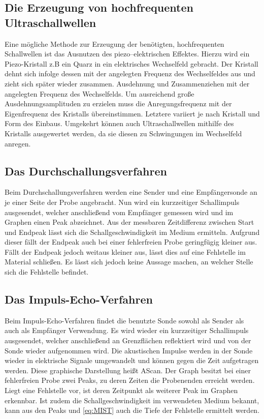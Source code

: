 \subsection{Die Erzeugung von hochfrequenten Ultraschallwellen}
Eine mögliche Methode zur Erzeugung der benötigten, hochfrequenten Schallwellen
ist das Ausnutzen des piezo--elektrischen Effektes. Hierzu wird ein Piezo-Kristall z.B ein Quarz
in ein elektrisches Wechselfeld gebracht. Der Kristall dehnt sich infolge dessen
mit der angelegten Frequenz des Wechselfeldes aus und zieht sich später wieder zusammen.
Ausdehnung und Zusammenziehen mit der angelegten Frequenz des Wechselfelds. Um
ausreichend große Ausdehnungsamplituden zu erzielen muss die Anregungsfrequenz
mit der Eigenfrequenz des Kristalls übereinstimmen. Letztere variiert je nach Kristall
und Form des Einbaus. Umgekehrt können auch Ultraschallwellen mithilfe des Kristalls
ausgewertet werden, da sie diesen zu Schwingungen im Wechselfeld anregen.
\subsection{Das Durchschallungsverfahren}
Beim Durchschallungsverfahren werden eine Sender und eine Empfängersonde an je
einer Seite der Probe angebracht. Nun wird ein kurzzeitiger Schallimpuls ausgesendet, welcher
anschließend vom Empfänger gemessen wird und im Graphen einen Peak abzeichnet. Aus
der messbaren Zeitdifferenz zwischen Start und Endpeak lässt sich die Schallgeschwindigkeit im Medium ermitteln. Aufgrund dieser fällt der Endpeak auch bei einer fehlerfreien Probe geringfügig kleiner aus. Fällt der Endpeak jedoch weitaus kleiner aus, lässt dies auf eine Fehlstelle im Material schließen.
Es lässt sich jedoch keine Aussage machen, an welcher Stelle sich die Fehlstelle befindet.

\subsection{Das Impuls-Echo-Verfahren}
Beim Impuls-Echo-Verfahren findet die benutzte Sonde sowohl als Sender als auch
als Empfänger Verwendung. Es wird wieder ein kurzzeitiger Schallimpuls ausgesendet,
welcher anschließend an Grenzflächen reflektiert wird und von der Sonde wieder aufgenommen wird.
Die akustischen Impulse werden in der Sonde wieder in elektrische Signale umgewandelt
und können gegen die Zeit aufgetragen werden. Diese graphische Darstellung heißt AScan. Der Graph besitzt bei einer
fehlerfreien Probe zwei Peaks, zu deren Zeiten die Probenenden erreicht werden.
Liegt eine Fehlstelle vor, ist deren Zeitpunkt als weiterer Peak im Graphen erkennbar. Ist
zudem die Schallgeschwindigkeit im verwendeten Medium bekannt, kann aus den Peaks
und \ref{eq:MIST} auch die Tiefe der Fehlstelle ermittelt werden.
